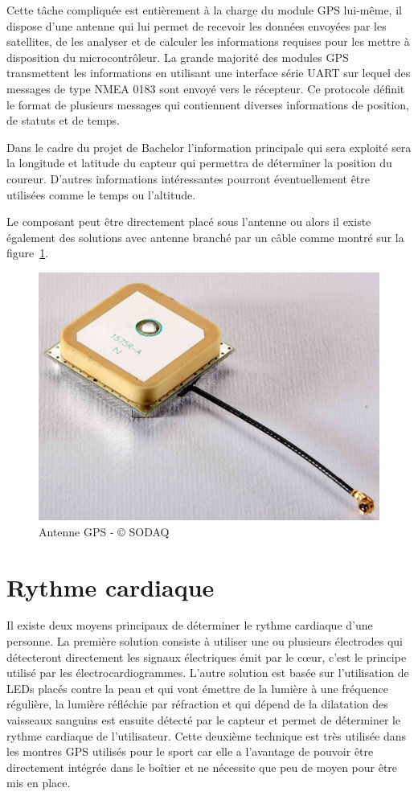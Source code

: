 Cette tâche compliquée est entièrement à la charge du module GPS lui-même, il dispose d’une antenne qui lui permet de recevoir les données envoyées par les satellites, de les analyser et de calculer les informations requises pour les mettre à disposition du microcontrôleur.
La grande majorité des modules GPS transmettent les informations en utilisant une interface série UART sur lequel des messages de type NMEA 0183 sont envoyé vers le récepteur. Ce protocole définit le format de plusieurs messages qui contiennent diverses informations de position, de statuts et de temps. \cite{nmea_0183}

Dans le cadre du projet de Bachelor l’information principale qui sera exploité sera la longitude et latitude du capteur qui permettra de déterminer la position du coureur. D’autres informations intéressantes pourront éventuellement être utilisées comme le temps ou l’altitude.

Le composant peut être directement placé sous l’antenne ou alors il existe également des solutions avec antenne branché par un câble comme montré sur la figure~\ref{fig:antenne_gps}.

\begin{figure}[htb]
\centering 
\includegraphics[width=0.6\columnwidth]{../images/active-gps-antenna-large.jpg} 
\caption[Antenne GPS]{Antenne GPS - © SODAQ}
\label{fig:antenne_gps}
\end{figure}

\section{Rythme cardiaque}

Il existe deux moyens principaux de déterminer le rythme cardiaque d’une personne. La première solution consiste à utiliser une ou plusieurs électrodes qui détecteront directement les signaux électriques émit par le cœur, c’est le principe utilisé par les électrocardiogrammes. L’autre solution est basée sur l’utilisation de LEDs placés contre la peau et qui vont émettre de la lumière à une fréquence régulière, la lumière réfléchie par réfraction et qui dépend de la dilatation des vaisseaux sanguins est ensuite détecté par le capteur et permet de déterminer le rythme cardiaque de l’utilisateur. Cette deuxième technique est très utilisée dans les montres GPS utilisés pour le sport car elle a l’avantage de pouvoir être directement intégrée dans le boîtier et ne nécessite que peu de moyen pour être mis en place.

